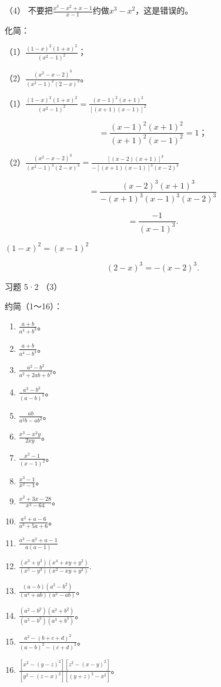 （4）
不要把\(\frac{x^3 - x^2 + x - 1}{x - 1}\)约做\(x^3 - x^2\)，这是错误的。

 化简：

（1）\(\frac{(1 - x)^2(1 + x)^2}{(x^2 - 1)^2}\)；

（2）\(\frac{(x^2 - x - 2)^3}{(x^2 - 1)^2(2 - x)^3}\)。


（1）\(\frac{(1 - x)^2(1 + x)^2}{(x^2 - 1)^2} = \frac{(x - 1)^2(x + 1)^2}{[(x + 1)(x - 1)]^2}\)

\[
= \frac{(x - 1) ^{2} (x + 1) ^{2}}{(x + 1) ^{2} (x - 1) ^{2}} = 1\text{；}
\]

（2）\(\frac{(x^2 - x - 2)^3}{(x^2 - 1)^3(2 - x)^3} = \frac{[(x - 2)(x + 1)]^3}{-[(x + 1)(x - 1)]^3(x - 2)^3}\)

\[
= \frac{(x - 2) ^{3} (x + 1) ^{3}}{- (x + 1) ^{3} (x - 1) ^{3} (x - 2) ^{3}}
\]

\[
= \frac{- 1}{(x - 1) ^{3}}.
\]

\((1 - x)^{2} = (x - 1)^{2}\)

\[
(2 - x) ^{3} = - (x - 2) ^{3}.
\]

习题 5·2 （3）

约简（1～16）：

\begin{enumerate}[start=1]
\item
  \(\frac{a + b}{a^3 + b^3}\)。
\item
  \(\frac{a + b}{a^4 - b^4}\)。
\item
  \(\frac{a^2 - b^2}{a^2 + 2ab + b^2}\)。
\item
  \(\frac{a^3 - b^3}{(a - b)^3}\)。
\item
  \(\frac{ab}{a^2b - ab^2}\)。
\item
  \(\frac{x^3 - x^2y}{2xy}\)。
\item
  \(\frac{x^2 - 1}{(x - 1)^2}\)。
\item
  \(\frac{x^3 - 1}{x^2 - 1}\)。
\item
  \(\frac{x^2 + 3x - 28}{x^3 - 64}\)。
\item
  \(\frac{a^2 + a - 6}{a^3 + 5a + 6}\)。
\item
  \(\frac{a^3 - a^2 + a - 1}{a(a - 1)}\)
\item
  \(\frac{(x^3 + y^3)(x^4 + xy + y^2)}{(x^5 - y^3)(x^2 - xy + y^2)}.\)
\item
  \(\frac{(a - b)(a^2 - b^2)}{(a^2 + ab)(a^2 - ab)}\)。
\item
  \(\frac{(a^2 - b^2)(a^2 + b^2)}{(a^3 - b^3)(a^3 + b^3)}\)。
\item
  \(\frac{a^2 - (b + c + d)^2}{(a - b)^2 - (c + d)^2}\)。
\item
  \(\frac{[x^2 - (y - z)^2][z^2 - (x - y)^2]}{[y^2 - (z - x)^2][(y + z)^2 - x^2]}\)。
\end{enumerate}

